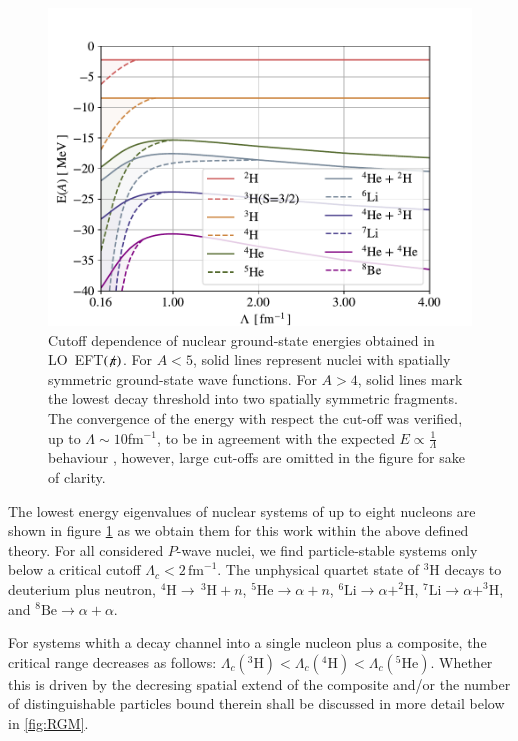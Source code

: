 \documentclass[preprint,12pt]{elsarticle}
\newcommand{\lc}{\ensuremath{\Lambda_c}}
\newcommand{\fm}{\ensuremath{\,\text{fm}^{-1}}}
\newcommand{\eftnopi}{\mbox{EFT$(\not \! \pi)$}}
\begin{document}
\begin{figure}
\centering
\includegraphics[width=\linewidth]{./Nuclear.pdf} 
\caption{Cutoff dependence of nuclear ground-state energies
obtained in LO~\eftnopi. For $A<5$, solid lines represent nuclei with
spatially symmetric ground-state wave functions. For $A>4$,
solid lines mark the lowest decay threshold into two spatially symmetric fragments.
The convergence of the energy with respect the cut-off was verified, up to $\Lambda\sim 10$fm$^{-1}$, to be in agreement with the expected $E\propto\tfrac{1}{\Lambda}$ behaviour \cite{Bedaque:1998kg, Barnea:2013uqa}, however, large cut-offs are omitted in the figure for sake of clarity.}
\label{fig:nuclear}
\end{figure}


The lowest energy eigenvalues of nuclear systems of up to eight nucleons are shown
in figure \ref{fig:nuclear} as we obtain them for this work within the above defined theory.
For all considered $P$-wave nuclei, we find particle-stable systems only below a critical cutoff $\lc<2\fm$.
The unphysical quartet state of $^3$H decays to deuterium plus neutron, $^4\text{H}\to\,^3\text{H} + n$, $^5\text{He}\to\alpha +n$, 
$^6\text{Li}\to\alpha+^2\text{H}$, $^7\text{Li}\to\alpha + ^3\text{H}$, and $^8\text{Be}\to \alpha+\alpha$.

For systems whith a decay channel into a single nucleon plus a composite, the critical range decreases as follows: $\lc(^3\text{H})<\lc(^4\text{H})<\lc(^5\text{He})$. Whether this is driven by the decresing spatial extend of the composite and/or
the number of distinguishable particles bound therein shall be discussed in more detail below in \ref{fig:RGM}.
\end{document}

